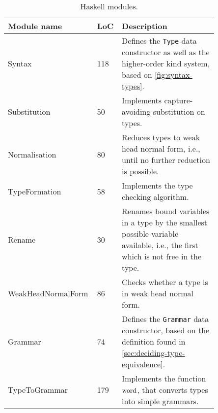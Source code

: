 \renewcommand{\arraystretch}{1.2}
\begin{table}[t!]
    \centering
    \begin{tabular}{@{\hskip 0.1in}p{0.3\linewidth}@{\hskip 0.1in} @{\hskip 0.1in}p{0.10\linewidth}@{\hskip 0.1in} @{\hskip 0.1in}p{0.45\linewidth}}
        \hline
        \textbf{Module name} & \textbf{LoC} & \textbf{Description}\\
        \hline
        Syntax & 118 & Defines the \lstinline|Type| data constructor as well as the higher-order kind system, based on \cref*{fig:syntax-types}.\\
        Substitution & 50 & Implements capture-avoiding substitution on types.\\
        Normalisation & 80 & Reduces types to weak head normal form, i.e., until no further reduction is possible.\\
        TypeFormation & 58 & Implements the type checking algorithm.\\
        Rename & 30 & Renames bound variables in a type by the smallest possible variable available, i.e., the first which is not free in the type.\\
        WeakHeadNormalForm & 86 & Checks whether a type is in weak head normal form.\\
        Grammar & 74 & Defines the \lstinline|Grammar| data constructor, based on the definition found in \cref*{sec:deciding-type-equivalence}.\\
        TypeToGrammar & 179 & Implements the function $\operatorname{word}$, that converts types into simple grammars.\\
        \hline
    \end{tabular}
    \caption{Haskell modules.}
    \label{tab:modules}
\end{table}

